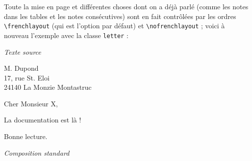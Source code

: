 \documentclass[a4paper,12pt,openright]{article}
\begin{document}
Toute la mise en page et différentes choses dont on a déjà parlé (comme les
notes dans les tables et les notes consécutives) sont en fait contrôlées par les
ordres \verb|\frenchlayout| (qui est l’option par défaut)
 et \verb|\nofrenchlayout| ; 
voici à nouveau l’exemple avec la classe \texttt{letter} :
\begin{center} %
\begin{minipage}{\textwidth}
\begin{center}
\textit{Texte source}\\[1ex]
\begin{boxedverbatim}
\nofrenchlayout
\address{B.          \textsc{Gaulle}}
\begin{letter}
{M. Dupond\\
17, rue St. \’Eloi\\
24140 La Monzie Montastruc}

\opening{Cher Monsieur X,}

La documentation est là !

\closing{Bonne lecture.}
\end{letter}
\end{boxedverbatim}
\end{center}
\end{minipage}

\noindent
\parbox[t]{66mm}{
\begin{center} \nofrenchtypography \nofrenchlayout \english
\textit{Composition standard}
\end{center}
}
\end{center}
\end{document}
